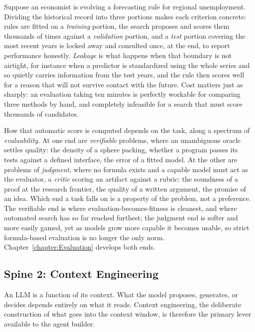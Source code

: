 \begin{example}
Suppose an economist is evolving a forecasting rule for regional unemployment.
Dividing the historical record into three portions makes each criterion concrete: rules are fitted on a \emph{training} portion, the search proposes and scores them thousands of times against a \emph{validation} portion, and a \emph{test} portion covering the most recent years is locked away and consulted once, at the end, to report performance honestly.
\emph{Leakage} is what happens when that boundary is not airtight, for instance when a predictor is standardized using the whole series and so quietly carries information from the test years, and the rule then scores well for a reason that will not survive contact with the future.
Cost matters just as sharply: an evaluation taking ten minutes is perfectly workable for comparing three methods by hand, and completely infeasible for a search that must score thousands of candidates.
\end{example}

How that automatic score is computed depends on the task, along a spectrum of \emph{evaluability}.
At one end are \emph{verifiable} problems, where an unambiguous oracle settles quality: the density of a sphere packing, whether a program passes its tests against a defined interface, the error of a fitted model.
At the other are problems of \emph{judgment}, where no formula exists and a capable model must act as the evaluator, a \emph{critic} scoring an artifact against a rubric: the soundness of a proof at the research frontier, the quality of a written argument, the promise of an idea.
Which end a task falls on is a property of the problem, not a preference.
The verifiable end is where evaluation-becomes-fitness is cleanest, and where automated search has so far reached furthest; the judgment end is softer and more easily gamed, yet as models grow more capable it becomes usable, so strict formula-based evaluation is no longer the only norm.
Chapter~\ref{chapter:Evaluation} develops both ends.

\subsection{Spine 2: Context Engineering}

An LLM is a function of its context.
What the model proposes, generates, or decides depends entirely on what it reads.
Context engineering, the deliberate construction of what goes into the context window, is therefore the primary lever available to the agent builder.

